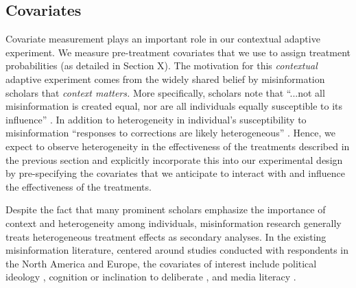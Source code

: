 \documentclass[letterpaper, 12pt, parskip=full,]{scrartcl}
\begin{document}


\subsection{Covariates}

Covariate measurement plays an important role in our contextual adaptive experiment. We measure pre-treatment covariates that we use to assign treatment probabilities (as detailed in Section X). 
The motivation for this \textit{contextual} adaptive experiment comes from the widely shared belief by misinformation scholars that \textit{context matters.} More specifically, scholars note that ``...not all misinformation is created equal, nor are all individuals equally susceptible to its influence'' \citep{wittenberg2020misinformation}. In addition to heterogeneity in individual's susceptibility to misinformation ``responses to corrections are likely heterogeneous'' \citep{swire2020searching}. Hence, we expect to observe heterogeneity in the effectiveness of the treatments described in the previous section and explicitly incorporate this into our experimental design by pre-specifying the covariates that we anticipate to interact with and influence the effectiveness of the treatments.

Despite the fact that many prominent scholars emphasize the importance of context and heterogeneity among individuals, misinformation research generally treats heterogeneous treatment effects as secondary analyses. In the existing misinformation literature, centered around studies conducted with respondents in the North America and Europe, the covariates of interest include political ideology \citep{pennycook_epstein_mosleh_arechar_eckles_rand_2019}, cognition or inclination to deliberate \citep{bago2020fake}, and media literacy \citep{guess2020digital}.  
\end{document}
